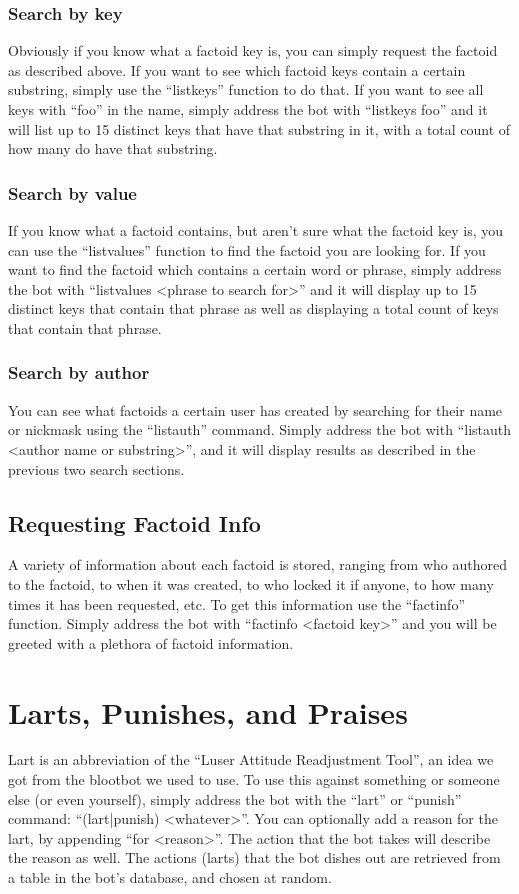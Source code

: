 \documentclass[titlepage]{article}
\begin{document}
			\subsubsection{Search by key}
				Obviously if you know what a factoid key is, you can simply
				request the factoid as described above.  If you want to see
				which factoid keys contain a certain substring, simply use the
				``listkeys'' function to do that.  If you want to see all keys
				with ``foo'' in the name, simply address the bot with
				``listkeys foo'' and it will list up to 15 distinct keys that
				have that substring in it, with a total count of how many do
				have that substring.

			\subsubsection{Search by value}
				If you know what a factoid contains, but aren't sure what the
				factoid key is, you can use the ``listvalues'' function to
				find the factoid you are looking for.  If you want to find the
				factoid which contains a certain word or phrase, simply
				address the bot with ``listvalues <phrase to search for>'' and
				it will display up to 15 distinct keys that contain that
				phrase as well as displaying a total count of keys that
				contain that phrase.

			\subsubsection{Search by author}
				You can see what factoids a certain user has created by
				searching for their name or nickmask using the ``listauth''
				command.  Simply address the bot with ``listauth <author name
				or substring>'', and it will display results as described in
				the previous two search sections.

		\subsection{Requesting Factoid Info}
			A variety of information about each factoid is stored, ranging
			from who authored to the factoid, to when it was created, to who
			locked it if anyone, to how many times it has been requested, etc.
			To get this information use the ``factinfo'' function.  Simply
			address the bot with ``factinfo <factoid key>'' and you will be
			greeted with a plethora of factoid information.
		
	\section{Larts, Punishes, and Praises}
		Lart is an abbreviation of the ``Luser Attitude Readjustment Tool'',
		an idea we got from the blootbot we used to use.  To use this against
		something or someone else (or even yourself), simply address the bot
		with the ``lart'' or ``punish'' command: ``(lart|punish) <whatever>''.
		You can optionally add a reason for the lart, by appending ``for
		<reason>''.  The action that the bot takes will describe the reason as
		well.  The actions (larts) that the bot dishes out are retrieved from
		a table in the bot's database, and chosen at random.
\end{document}
